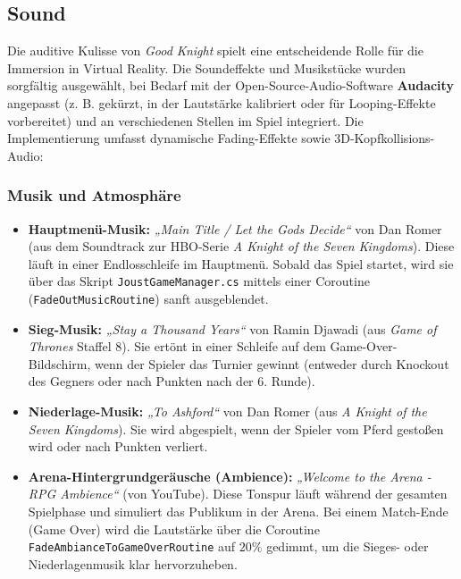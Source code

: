 \documentclass[11pt, a4paper]{article}
\begin{document}
\subsection{Sound}
Die auditive Kulisse von \textit{Good Knight} spielt eine entscheidende Rolle für die Immersion in Virtual Reality. Die Soundeffekte und Musikstücke wurden sorgfältig ausgewählt, bei Bedarf mit der Open-Source-Audio-Software \textbf{Audacity} angepasst (z. B. gekürzt, in der Lautstärke kalibriert oder für Looping-Effekte vorbereitet) und an verschiedenen Stellen im Spiel integriert. Die Implementierung umfasst dynamische Fading-Effekte sowie 3D-Kopfkollisions-Audio:


\subsubsection{Musik und Atmosphäre}
\begin{itemize}
    \item \textbf{Hauptmenü-Musik:} \textit{„Main Title / Let the Gods Decide“} von Dan Romer (aus dem Soundtrack zur HBO-Serie \textit{A Knight of the Seven Kingdoms}). Diese läuft in einer Endlosschleife im Hauptmenü. Sobald das Spiel startet, wird sie über das Skript \texttt{JoustGameManager.cs} mittels einer Coroutine (\texttt{FadeOutMusicRoutine}) sanft ausgeblendet.
    
    \item \textbf{Sieg-Musik:} \textit{„Stay a Thousand Years“} von Ramin Djawadi (aus \textit{Game of Thrones} Staffel 8). Sie ertönt in einer Schleife auf dem Game-Over-Bildschirm, wenn der Spieler das Turnier gewinnt (entweder durch Knockout des Gegners oder nach Punkten nach der 6. Runde).
    
    \item \textbf{Niederlage-Musik:} \textit{„To Ashford“} von Dan Romer (aus \textit{A Knight of the Seven Kingdoms}). Sie wird abgespielt, wenn der Spieler vom Pferd gestoßen wird oder nach Punkten verliert.
    
    \item \textbf{Arena-Hintergrundgeräusche (Ambience):} \textit{„Welcome to the Arena - RPG Ambience“} (von YouTube). Diese Tonspur läuft während der gesamten Spielphase und simuliert das Publikum in der Arena. Bei einem Match-Ende (Game Over) wird die Lautstärke über die Coroutine \texttt{FadeAmbianceToGameOverRoutine} auf $20\%$ gedimmt, um die Sieges- oder Niederlagenmusik klar hervorzuheben.
\end{itemize}
\end{document}
